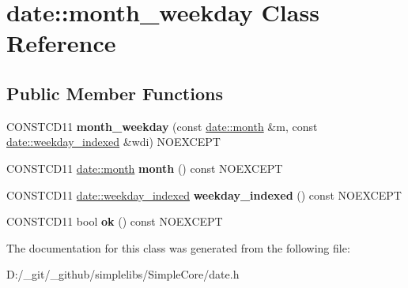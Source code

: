 \hypertarget{classdate_1_1month__weekday}{}\section{date\+::month\+\_\+weekday Class Reference}
\label{classdate_1_1month__weekday}
\subsection*{Public Member Functions}
\begin{DoxyCompactItemize}
\item 
\mbox{\label{classdate_1_1month__weekday_a99e32650eba86c9e064703f994a37b81}} 
C\+O\+N\+S\+T\+C\+D11 {\bfseries month\+\_\+weekday} (const \mbox{\hyperlink{classdate_1_1month}{date\+::month}} \&m, const \mbox{\hyperlink{classdate_1_1weekday__indexed}{date\+::weekday\+\_\+indexed}} \&wdi) N\+O\+E\+X\+C\+E\+PT
\item 
\mbox{\label{classdate_1_1month__weekday_aee496dec1d5eef3ccbd43eae2548ad33}} 
C\+O\+N\+S\+T\+C\+D11 \mbox{\hyperlink{classdate_1_1month}{date\+::month}} {\bfseries month} () const N\+O\+E\+X\+C\+E\+PT
\item 
\mbox{\label{classdate_1_1month__weekday_acc93f76b3a096d5f40b61fc46f377fb1}} 
C\+O\+N\+S\+T\+C\+D11 \mbox{\hyperlink{classdate_1_1weekday__indexed}{date\+::weekday\+\_\+indexed}} {\bfseries weekday\+\_\+indexed} () const N\+O\+E\+X\+C\+E\+PT
\item 
\mbox{\label{classdate_1_1month__weekday_ae300acb90f2a931979a5f61521fefd52}} 
C\+O\+N\+S\+T\+C\+D11 bool {\bfseries ok} () const N\+O\+E\+X\+C\+E\+PT
\end{DoxyCompactItemize}


The documentation for this class was generated from the following file\+:\begin{DoxyCompactItemize}
\item 
D\+:/\+\_\+git/\+\_\+github/simplelibs/\+Simple\+Core/date.\+h\end{DoxyCompactItemize}
